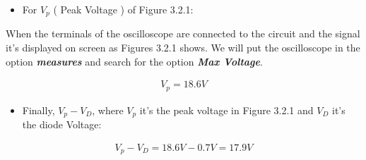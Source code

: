 {\bfseries\itshape
\begin{itemize}
\item For $V_{p}$ ( Peak Voltage ) of Figure 3.2.1:
\end{itemize}} 

When the terminals of the oscilloscope are connected to the circuit and the signal it's displayed on screen as Figures 3.2.1 shows. We will put the oscilloscope in the option {\bfseries\itshape measures} and search for the option {\bfseries\itshape Max Voltage}. \hfill \break

\begin{ceqn}
\begin{align}
V_{p} = 18.6 V
\end{align}
\end{ceqn} \hfill 

{\bfseries\itshape
\begin{itemize}
\item Finally, $V_{p} - V_{D}$, where $V_{p}$ it's the peak voltage in Figure 3.2.1 and $V_{D}$ it's the diode Voltage:
\end{itemize}} \hfill

\begin{ceqn}
\begin{align}
V_{p} - V_{D} = 18.6 V - 0.7 V = 17.9 V
\end{align}
\end{ceqn}

\pagebreak